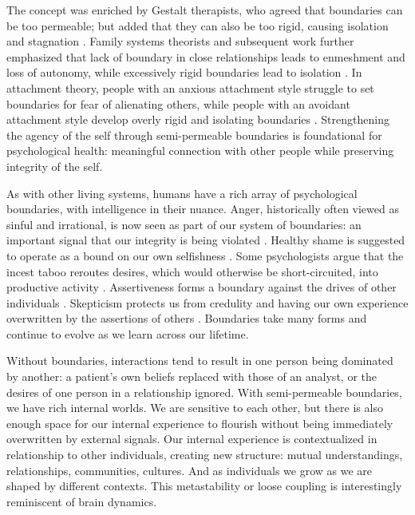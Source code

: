 \documentclass[12pt]{article}
\begin{document}
The concept was enriched by Gestalt therapists, who agreed that boundaries can be too permeable; but added that they can also be too rigid, causing isolation and stagnation \citep{perls1951gestalt, polster1974gestalt, yontef1993awareness}. Family systems theorists and subsequent work further emphasized that lack of boundary in close relationships leads to enmeshment and loss of autonomy, while excessively rigid boundaries lead to isolation \citep{minuchin1974families, bowen1978family, cloud1992boundaries, brown2012daring}. In attachment theory, people with an anxious attachment style struggle to set boundaries for fear of alienating others, while people with an avoidant attachment style develop overly rigid and isolating boundaries \citep{ainsworth1978patterns}. Strengthening the agency of the self through semi-permeable boundaries is foundational for psychological health: meaningful connection with other people while preserving integrity of the self. 

As with other living systems, humans have a rich array of psychological boundaries, with intelligence in their nuance. Anger, historically often viewed as sinful and irrational, is now seen as part of our system of boundaries: an important signal that our integrity is being violated \citep{lerner1985dance, videbeck2010psychiatric, sell2011recalibrational}. Healthy shame is suggested to operate as a bound on our own selfishness \citep{bradshaw1988healing}. Some psychologists argue that the incest taboo reroutes desires, which would otherwise be short-circuited, into productive activity \citep{stein1973incest, levistrauss1949structures, freud1913totem}. Assertiveness forms a boundary against the drives of other individuals \citep{smith1985say}. Skepticism protects us from credulity and having our own experience overwritten by the assertions of others \citep{lewandowsky2012misinformation, sperber2010epistemic}. Boundaries take many forms and continue to evolve as we learn across our lifetime.


Without boundaries, interactions tend to result in one person being dominated by another: a patient's own beliefs replaced with those of an analyst, or the desires of one person in a relationship ignored. With semi-permeable boundaries, we have rich internal worlds. We are sensitive to each other, but there is also enough space for our internal experience to flourish without being immediately overwritten by external signals. Our internal experience is contextualized in relationship to other individuals, creating new structure: mutual understandings, relationships, communities, cultures. And as individuals we grow as we are shaped by different contexts. This metastability or loose coupling is interestingly reminiscent of brain dynamics.
\end{document}
